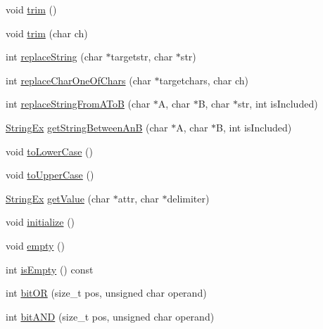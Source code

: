 \begin{CompactItemize}
\item 
void \hyperlink{classStringEx_d36b21f97aac5288fa44243bcb9a696a}{trim} ()
\item 
void \hyperlink{classStringEx_48fbbe07c043f88eb2d2e00f9b860f4c}{trim} (char ch)
\item 
int \hyperlink{classStringEx_36d8239844aff03b54954f8e888fdf7b}{replaceString} (char $\ast$targetstr, char $\ast$str)
\item 
int \hyperlink{classStringEx_1dc160e24fe7a9eddb7e0ac5ac71a6ba}{replaceCharOneOfChars} (char $\ast$targetchars, char ch)
\item 
int \hyperlink{classStringEx_1ff835f987af94b21d5e0624039dfb62}{replaceStringFromAToB} (char $\ast$A, char $\ast$B, char $\ast$str, int isIncluded)
\item 
\hyperlink{classStringEx}{StringEx} \hyperlink{classStringEx_76f316d1d3db65232f5ad8224ab3db9c}{getStringBetweenAnB} (char $\ast$A, char $\ast$B, int isIncluded)
\item 
void \hyperlink{classStringEx_a8111c5edd12e94d7f6e470ccb4f0ba7}{toLowerCase} ()
\item 
void \hyperlink{classStringEx_fae06b05072e4fcd4e62ea9d2431336d}{toUpperCase} ()
\item 
\hyperlink{classStringEx}{StringEx} \hyperlink{classStringEx_b78db0441abdf6a0f5d57aaba69df789}{getValue} (char $\ast$attr, char $\ast$delimiter)
\item 
void \hyperlink{classStringEx_4fc92209cf4427f463558800800c3647}{initialize} ()
\item 
void \hyperlink{classStringEx_7d44674c98832f52ed546659d6309762}{empty} ()
\item 
int \hyperlink{classStringEx_88e19f0888814f720ef6b1bbec459ded}{isEmpty} () const 
\item 
int \hyperlink{classStringEx_621b56ed19f2d9de1fe6ecc7e39edc56}{bitOR} (size\_\-t pos, unsigned char operand)
\item 
int \hyperlink{classStringEx_be938bfb161e2ed249e485f0224d056a}{bitAND} (size\_\-t pos, unsigned char operand)
\end{CompactItemize}
